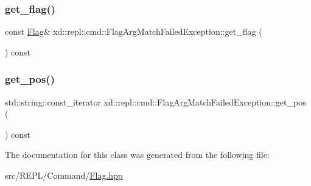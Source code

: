 \subsubsection{\texorpdfstring{get\+\_\+flag()}{get\_flag()}}
{\footnotesize\ttfamily const \mbox{\hyperlink{classxd_1_1repl_1_1cmd_1_1_flag}{Flag}}\& xd\+::repl\+::cmd\+::\+Flag\+Arg\+Match\+Failed\+Exception\+::get\+\_\+flag (\begin{DoxyParamCaption}{ }\end{DoxyParamCaption}) const\hspace{0.3cm}{\ttfamily [inline]}}

\mbox{\label{classxd_1_1repl_1_1cmd_1_1_flag_arg_match_failed_exception_ad3fae363fabebfb547a2e0f3ac36f298}} 
\subsubsection{\texorpdfstring{get\+\_\+pos()}{get\_pos()}}
{\footnotesize\ttfamily std\+::string\+::const\+\_\+iterator xd\+::repl\+::cmd\+::\+Flag\+Arg\+Match\+Failed\+Exception\+::get\+\_\+pos (\begin{DoxyParamCaption}{ }\end{DoxyParamCaption}) const\hspace{0.3cm}{\ttfamily [inline]}}



The documentation for this class was generated from the following file\+:\begin{DoxyCompactItemize}
\item 
src/\+R\+E\+P\+L/\+Command/\mbox{\hyperlink{_flag_8hpp}{Flag.\+hpp}}\end{DoxyCompactItemize}
